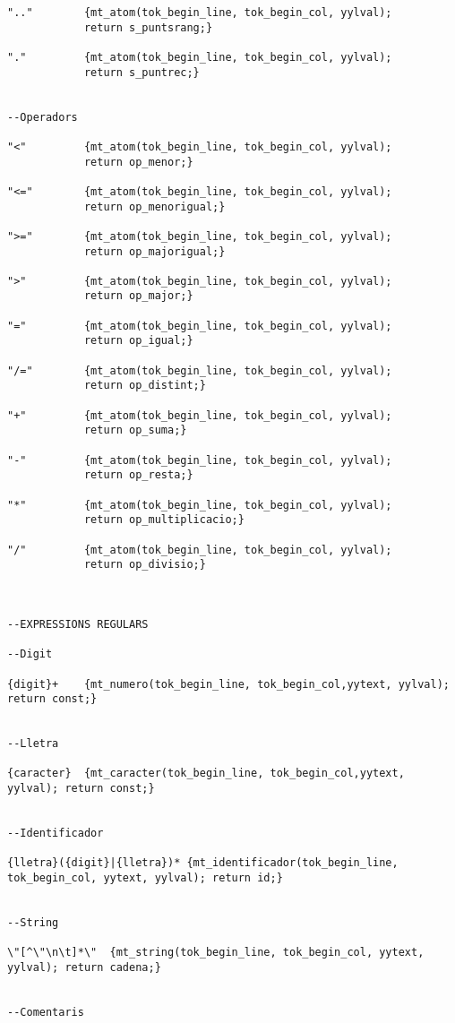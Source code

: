 \documentclass[10pt]{report}
\begin{document}
\begin{lstlisting}
".."        {mt_atom(tok_begin_line, tok_begin_col, yylval); 
            return s_puntsrang;}
            
"."         {mt_atom(tok_begin_line, tok_begin_col, yylval); 
            return s_puntrec;}


--Operadors

"<"         {mt_atom(tok_begin_line, tok_begin_col, yylval); 
            return op_menor;}

"<="        {mt_atom(tok_begin_line, tok_begin_col, yylval);
            return op_menorigual;}

">="        {mt_atom(tok_begin_line, tok_begin_col, yylval);
            return op_majorigual;}

">"         {mt_atom(tok_begin_line, tok_begin_col, yylval); 
            return op_major;}

"="         {mt_atom(tok_begin_line, tok_begin_col, yylval); 
            return op_igual;}

"/="        {mt_atom(tok_begin_line, tok_begin_col, yylval); 
            return op_distint;}

"+"         {mt_atom(tok_begin_line, tok_begin_col, yylval); 
            return op_suma;}

"-"         {mt_atom(tok_begin_line, tok_begin_col, yylval); 
            return op_resta;}

"*"         {mt_atom(tok_begin_line, tok_begin_col, yylval);
            return op_multiplicacio;}

"/"         {mt_atom(tok_begin_line, tok_begin_col, yylval); 
            return op_divisio;}



--EXPRESSIONS REGULARS

--Digit

{digit}+    {mt_numero(tok_begin_line, tok_begin_col,yytext, yylval); return const;}
            
            
--Lletra

{caracter}  {mt_caracter(tok_begin_line, tok_begin_col,yytext, yylval); return const;}
            

--Identificador

{lletra}({digit}|{lletra})* {mt_identificador(tok_begin_line, tok_begin_col, yytext, yylval); return id;}


--String

\"[^\"\n\t]*\"  {mt_string(tok_begin_line, tok_begin_col, yytext, yylval); return cadena;}


--Comentaris


\end{lstlisting}
\end{document}
